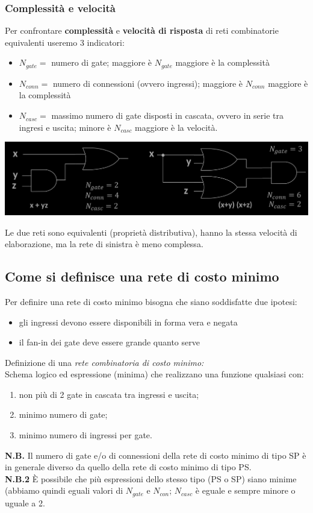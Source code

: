 \documentclass{article}
\begin{document}
\subsubsection{Complessità e velocità}
Per confrontare \textbf{complessità} e \textbf{velocità di risposta} di reti combinatorie equivalenti useremo 3 indicatori:
\begin{itemize}
    \item $N_{gate}=$ numero di gate; maggiore è $N_{gate}$ maggiore è la complessità
    \item $N_{conn}=$ numero di connessioni (ovvero ingressi); maggiore è $N_{conn}$ maggiore è la complessità
    \item $N_{casc}=$ massimo numero di gate disposti in cascata, ovvero in serie tra ingresi e uscita; minore è $N_{casc}$ maggiore è la velocità.
\end{itemize}
\begin{center}
    \includegraphics[scale=0.38]{escompl.png}
\end{center}
Le due reti sono equivalenti (proprietà distributiva), hanno la stessa velocità di elaborazione, ma la rete di sinistra è meno complessa.
\subsection{Come si definisce una rete di costo minimo}
Per definire una rete di costo minimo bisogna che siano soddisfatte due ipotesi:
\begin{itemize}
    \item gli ingressi devono essere disponibili in forma vera e negata
    \item il fan-in dei gate deve essere grande quanto serve
\end{itemize}
Definizione di una \textit{rete combinatoria di costo minimo:}
\vspace{0.1cm}\\
Schema logico ed espressione (minima) che realizzano una funzione qualsiasi con:
\begin{enumerate}
    \item non più di 2 gate in cascata tra ingressi e uscita;
    \item minimo numero di gate;
    \item minimo numero di ingressi per gate.
\end{enumerate}
\textbf{N.B.} Il numero di gate e/o di connessioni della rete di costo minimo di tipo SP è in generale diverso da quello della rete di costo minimo di tipo PS.\\
\textbf{N.B.2} È possibile che più espressioni dello stesso tipo (PS o SP) siano minime (abbiamo quindi eguali valori di $N_{gate}$ e $N_{con}$; $N_{casc}$ è eguale e sempre minore o uguale a 2.
\end{document}
